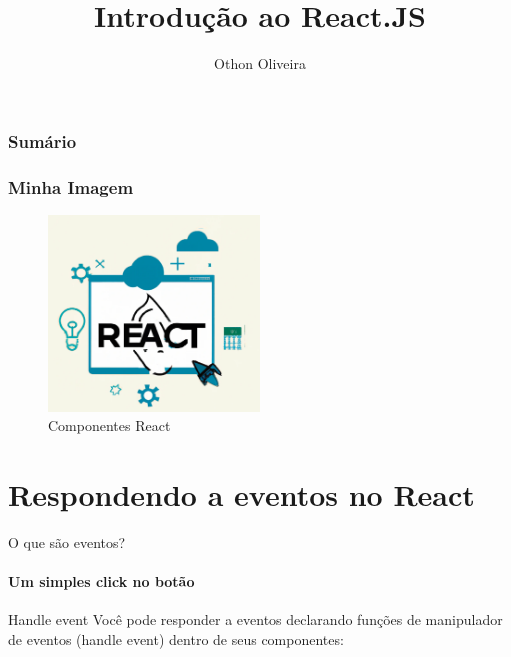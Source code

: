 \documentclass[13pt, xcolor={dvipsnames,svgnames}, portuguese]{beamer}
\author{Othon Oliveira}
\title{Introdução ao React.JS}
\institute{SENAC - PROA}
\date{}
\begin{document}
\begin{frame}
\titlepage
\end{frame}

\newcommand{\capa}{
    \begin{tikzpicture}[remember picture,overlay]
        \node at (current page.south west)
            {\begin{tikzpicture}[remember picture, overlay]
                \fill[shading=radial,top color=orange,bottom color=orange,middle color=yellow] (0,0) rectangle (\paperwidth,\paperheight);
            \end{tikzpicture}
          };
    \end{tikzpicture}
}

\begin{frame}\frametitle{Sumário}
\tableofcontents
\end{frame}


\begin{frame}
\frametitle{Minha Imagem}
\begin{figure}
\centering
\includegraphics[width=0.5\textwidth]{Figuras/react1.png}
\caption{Componentes React}
\end{figure}
\end{frame}

\section{Respondendo a eventos no React}
\begin{frame}{O que são eventos?}
\framesubtitle{Um simples click no botão}
	\begin{block}{Handle event}
       Você pode responder a eventos declarando funções de manipulador de eventos (handle event) dentro de seus componentes:
	\end{block}	
	
\end{frame}
\end{document}
